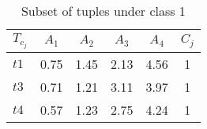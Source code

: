 \begin{table}[h]
\caption{Subset of tuples under class 1}
\label{table:table2_2}
\centering
\begin{tabular}{lccccc}
	\toprule
	\textbf{$\mathit{T_{c_j}}$} & \textbf{$\mathit{A_1}$} & \textbf{$\mathit{A_2}$} & \textbf{$\mathit{A_3}$} & \textbf{$\mathit{A_4}$} & \textbf{$\mathit{C_j}$} \\
	\midrule
	$\mathit{t1}$ & 0.75 & 1.45 & 2.13 & 4.56 & 1 \\
	$\mathit{t3}$ & 0.71 & 1.21 & 3.11 & 3.97 & 1 \\
	$\mathit{t4}$ & 0.57 & 1.23 & 2.75 & 4.24 & 1 \\
	\bottomrule
\end{tabular} 
\end{table}
